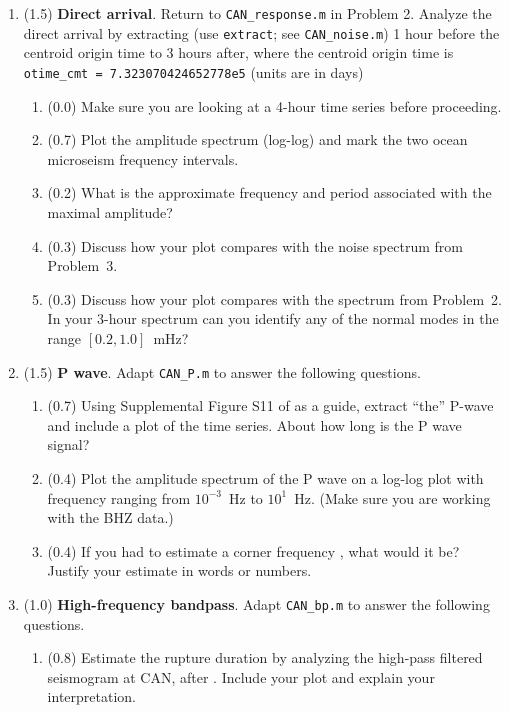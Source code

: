 \documentclass[11pt,titlepage,fleqn]{article}
\begin{document}
\begin{enumerate}
\item (1.5) {\bf Direct arrival}. 
Return to \verb+CAN_response.m+ in Problem 2.
Analyze the direct arrival by extracting (use \verb+extract+; \eg see \verb+CAN_noise.m+) 1 hour before the centroid origin time to 3 hours after, where the centroid origin time is \\ \verb+otime_cmt = 7.323070424652778e5+ (units are in days)

\begin{enumerate}
\item (0.0) Make sure you are looking at a 4-hour time series before proceeding.
\item (0.7) Plot the amplitude spectrum (log-log) and mark the two ocean microseism frequency intervals.
\item (0.2) What is the approximate frequency and period associated with the maximal amplitude?
\item (0.3) Discuss how your plot compares with the noise spectrum from Problem~3.
\item (0.3) Discuss how your plot compares with the spectrum from Problem~2. \\
In your 3-hour spectrum can you identify any of the normal modes in the range $[0.2,1.0]$~mHz?
\end{enumerate}


\item (1.5) {\bf P wave}. Adapt \verb+CAN_P.m+ to answer the following questions.
%
\begin{enumerate}
\item (0.7) Using Supplemental Figure S11 of \citet{Ammon2005} as a guide, extract ``the'' P-wave and include a plot of the time series. About how long is the P wave signal?
\item (0.4) Plot the amplitude spectrum of the P wave on a log-log plot with frequency ranging from $10^{-3}$~Hz to $10^1$~Hz. (Make sure you are working with the BHZ data.)

\item (0.4) If you had to estimate a corner frequency \citep[][p.~267]{SteinWysession}, what would it be? Justify your estimate in words or numbers.
\end{enumerate}


\item (1.0) {\bf High-frequency bandpass}. Adapt \verb+CAN_bp.m+ to answer the following questions.
%
\begin{enumerate}
\item (0.8) Estimate the rupture duration by analyzing the high-pass filtered seismogram at CAN, after \citet{Ni2005}. Include your plot and explain your interpretation.


\end{enumerate}
\end{enumerate}
\end{document}
